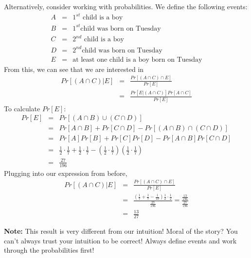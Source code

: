 \documentclass[11pt]{article}
\newif\ifsolutions
\begin{document}
\begin{enumerate}
\begin{enumerate}
{{Alternatively, consider working with probabilities. We define the following events:
\begin{eqnarray*}
A &=& 1^{st} \text{ child is a boy}\\
B &=& 1^{st} \text{child was born on Tuesday}\\
C &=& 2^{nd} \text{ child is a boy}\\
D &=& 2^{nd} \text{child was born on Tuesday}\\
E &=& \text{at least one child is a boy born on Tuesday}
\end{eqnarray*}
From this, we can see that we are interested in
\begin{eqnarray*}
Pr[(A \cap C) | E] &=& \frac{Pr[(A \cap C) \cap E]}{Pr[E]}\\
&=& \frac{Pr[E | (A \cap C)] Pr[A \cap C]}{Pr[E]}
\end{eqnarray*}
To calculate $Pr[E]$:
\begin{eqnarray*}
Pr[E] &=& Pr[(A \cap B) \cup (C \cap D)]\\
&=& Pr[A \cap B] + Pr[C \cap D] - Pr[(A \cap B) \cap (C \cap D)]\\
&=& Pr[A]Pr[B] + Pr[C]Pr[D] - Pr[A \cap B]Pr[C \cap D]\\
&=& \frac{1}{2} \cdot \frac{1}{7} + \frac{1}{2} \cdot \frac{1}{7} - (\frac{1}{2} \cdot \frac{1}{7})(\frac{1}{2} \cdot \frac{1}{7})\\
&=& \frac{27}{196}
\end{eqnarray*}
Plugging into our expression from before,
\begin{eqnarray*}
Pr[(A \cap C) | E] &=& \frac{Pr[(A \cap C) \cap E]}{Pr[E]}\\
&=& \frac{(\frac{1}{7} + \frac{1}{7} - \frac{1}{49})\frac{1}{2} \cdot \frac{1}{2}}{\frac{27}{196}} = \frac{\frac{13}{196}}{\frac{27}{196}}\\
&=& \frac{13}{27}
\end{eqnarray*}
	
\textbf{Note:} This result is very different from our intuition! Moral of the story? You can't always trust your intuition to be correct! Always define events and work through the probabilities first!

}} \fi

\end{enumerate}

\ifsolutions{\color{blue}{
Note: For both parts, assume that the probability of a boy or girl being born is the same, a child is equally likely to be born on any day of the week, and the genders of all children are independent of each other and independent of the day of the week.

}}
\end{enumerate}
\end{document}
